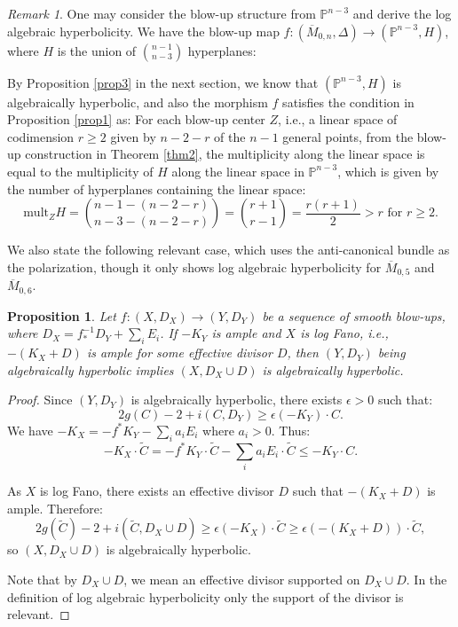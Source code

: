 \documentclass{amsart}
\newtheorem{proposition}[theorem]{Proposition}
\theoremstyle{definition}
\theoremstyle{remark}
\newtheorem{remark}[theorem]{Remark}
\begin{document}
\begin{remark}
   One may consider the blow-up structure from $\mathbb P^{n-3}$ and derive the log algebraic hyperbolicity. We have the blow-up map $f:(\overline{M}_{0,n}, \Delta)\to (\mathbb P^{n-3}, H)$, where $H$ is the union of $\binom{n-1}{n-3}$ hyperplanes: 
   
  By Proposition \ref{prop3} in the next section, we know that $(\mathbb P^{n-3}, H)$ is algebraically hyperbolic, and also the morphism $f$ satisfies the condition in Proposition \ref{prop1} as: 
For each blow-up center $Z$, i.e., a linear space of codimension $r\geq 2$ given by $n-2-r$ of the $n-1$ general points, from the blow-up construction in Theorem \ref{thm2}, the multiplicity along the linear space is equal to the multiplicity of $H$ along the linear space in $\mathbb P^{n-3}$, which is given by the number of hyperplanes containing the linear space:
\[ \mathrm{mult}_Z H = \binom{n-1 - (n-2-r)}{n-3 - (n-2-r)} = \binom{r+1}{r-1} = \frac{r(r+1)}{2} > r \text{ for } r \geq 2. \]
\end{remark}
\vspace{0.3cm}

We also state the following relevant case, which uses the anti-canonical bundle as the polarization, though it only shows log algebraic hyperbolicity for $\overline{M}_{0,5}$ and $\overline{M}_{0,6}$.

\begin{proposition}
Let $f: (X,D_X) \to (Y,D_Y)$ be a sequence of smooth blow-ups, where $D_X=f_*^{-1}D_Y+\sum_iE_i$. If $-K_Y$ is ample and $X$ is log Fano, i.e., $-(K_X+D)$ is ample for some effective divisor $D$, then $(Y,D_Y)$ being algebraically hyperbolic implies $(X,D_X\cup D)$ is algebraically hyperbolic.
\end{proposition}

\begin{proof}
Since $(Y,D_Y)$ is algebraically hyperbolic, there exists $\epsilon > 0$ such that:
\[ 2g(C) - 2 + i(C,D_Y) \geq \epsilon (-K_Y) \cdot C . \]
We have $-K_X = -f^*K_Y - \sum_ia_iE_i$ where $a_i>0$. Thus:
\[ -K_X \cdot \widetilde{C} = -f^*K_Y \cdot \widetilde{C} - \sum_i a_iE_i \cdot \widetilde{C}  \leq -K_Y \cdot C.\]

As $X$ is log Fano, there exists an effective divisor $D$ such that $-(K_X + D)$ is ample. Therefore:
\[ 2g(\widetilde{{C}}) - 2 + i(\widetilde{C},D_X\cup D) \geq \epsilon (-K_X) \cdot \widetilde{C} \geq \epsilon (-(K_X + D)) \cdot \widetilde{C} , \]
so $(X,D_X\cup D)$ is algebraically hyperbolic. 

Note that by $D_X\cup D$, we mean an effective divisor supported on $D_X\cup D$. In the definition of log algebraic hyperbolicity only the support of the divisor is relevant.
\end{proof}
\end{document}
